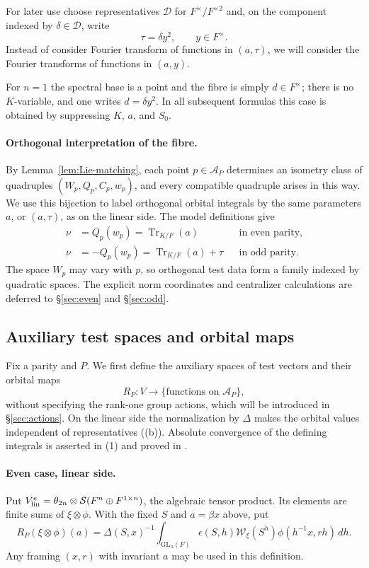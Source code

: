 \documentclass[11pt,oneside,notitlepage]{book}
\numberwithin{equation}{section}
\theoremstyle{plain}
\theoremstyle{definition}
\newcommand{\GL}{\mathrm{GL}}
\newcommand{\cS}{\mathcal{S}}
\newcommand{\cW}{\mathcal{W}}
\newcommand{\Tr}{\operatorname{Tr}}
\begin{document}
For later use choose representatives $\mathcal D$ for
$F^\times/F^{\times2}$ and, on the component indexed by
$\delta\in\mathcal D$, write
\[
\tau=\delta y^2,\qquad y\in F^\times.
\]
Instead of consider Fourier transform of functions in $(a,\tau)$, we will consider the Fourier transforms of functions in $(a,y)$.

For $n=1$ the spectral base is a point and the fibre is simply
$d\in F^\times$; there is no $K$-variable, and one writes
$d=\delta y^2$. In all subsequent formulas this case is obtained by
suppressing $K$, $a$, and $S_0$.



\paragraph{Orthogonal interpretation of the fibre.}
\label{par:orthogonal-fibre}
By Lemma~\ref{lem:Lie-matching}, each point $p\in\mathcal A_P$ determines an isometry class of quadruples $(W_p,Q_p,C_p,w_p)$, and every compatible quadruple arises in this way. We use this bijection to label orthogonal orbital integrals by the same parameters $a$, or $(a,\tau)$, as on the linear side. The model definitions give
\[
 \begin{aligned}
  \nu&=Q_p(w_p)=\Tr_{K/F}(a)&&\text{in even parity},\\
  \nu&=-Q_p(w_p)=\Tr_{K/F}(a)+\tau&&\text{in odd parity}.
 \end{aligned}
\]
The space $W_p$ may vary with $p$, so orthogonal test data form a family indexed by quadratic spaces. The explicit norm coordinates and centralizer calculations are deferred to \S\ref{sec:even} and \S\ref{sec:odd}.

\subsection*{Auxiliary test spaces and orbital maps}
Fix a parity and $P$. We first define the auxiliary spaces of test vectors and their orbital maps
\[
 R_P:V\longrightarrow\{\text{functions on }\mathcal A_P\},
\]
without specifying the rank-one group actions, which will be introduced in \S\ref{sec:actions}. On the linear side the normalization by $\Delta$ makes the orbital values independent of representatives ((b)). Absolute convergence of the defining integrals is asserted in (1) and proved in .

\paragraph{Even case, linear side.} Put $V^e_{\rm lin}=\theta_{2n}\otimes\cS(F^n\oplus F^{1\times n})$, the algebraic tensor product. Its elements are finite sums of $\xi\otimes\phi$. With the fixed $S$ and $a=\beta x$ above, put
\[
 R_P(\xi\otimes\phi)(a)
 =\Delta(S,x)^{-1}\int_{\GL_n(F)}
 \epsilon(S,h)\cW_\xi(S^h)\phi(h^{-1}x,rh)\,dh.
\]
Any framing $(x,r)$ with invariant $a$ may be used in this definition.
\end{document}
